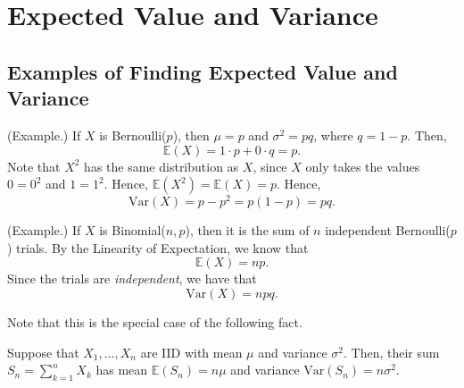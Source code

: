 \documentclass[letterpaper]{article}
\begin{document}
\section{Expected Value and Variance}
\subsection{Examples of Finding Expected Value and Variance}

\begin{mdframed}[]
    (Example.) If $X$ is Bernoulli($p$), then $\mu = p$ and $\sigma^2 = pq$, where $q = 1 - p$. Then, 
    \[\mathbb{E}(X) = 1 \cdot p + 0 \cdot q = p.\]
    Note that $X^2$ has the same distribution as $X$, since $X$ only takes the values $0 = 0^2$ and $1 = 1^2$. Hence, $\mathbb{E}(X^2) = \mathbb{E}(X) = p$. Hence, 
    \[\text{Var}(X) = p - p^2 = p(1 - p) = pq.\]
\end{mdframed}

\begin{mdframed}[]
    (Example.) If $X$ is Binomial($n, p$), then it is the sum of $n$ independent Bernoulli($p$) trials. By the Linearity of Expectation, we know that 
    \[\mathbb{E}(X) = np.\]
    Since the trials are \emph{independent}, we have that 
    \[\text{Var}(X) = npq.\]
\end{mdframed}
Note that this is the special case of the following fact. 
\begin{theorem}{}{}
    Suppose that $X_1, \dots, X_n$ are IID with mean $\mu$ and variance $\sigma^2$. Then, their sum $S_n = \sum_{k = 1}^{n} X_k$ has mean $\mathbb{E}(S_n) = n\mu$ and variance $\text{Var}(S_n) = n\sigma^2$. 
\end{theorem}
\end{document}
